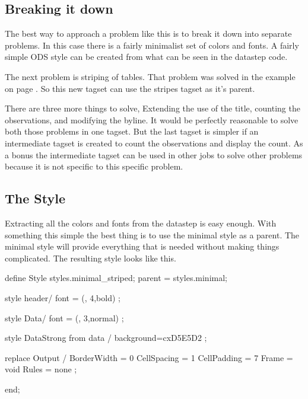 \subsection{Breaking it down}
The best way to approach a problem like this is to break it down into separate
problems.  In this case there is a fairly minimalist set of colors and fonts.
A fairly simple ODS style can be created from what can be seen in the datastep code.

The next problem is striping of tables.  That problem was solved in the example on
page \pageref{striped_table}.
So this new tagset can use the stripes tagset as it's parent.  

There are three more things to solve, Extending the use of the title, counting the 
observations, and modifying the byline.  It would be perfectly
reasonable to solve both those problems in one tagset.  But the last
tagset is simpler if an
intermediate tagset is created to count the observations and display the count.
As a bonus the intermediate tagset can be used in other jobs to solve
other problems because it is not specific to this specific problem.

\subsection{The Style}
Extracting all the colors and fonts from the datastep is easy enough.  
With something this simple the best thing is to use the minimal style as
a parent.  The minimal style will provide everything that is needed 
without making things complicated.
The resulting style looks like this.

\begin{sfvcode}
    define Style styles.minimal_striped; 
        parent = styles.minimal;

        style header/
            font = (, 4,bold)
        ;

        style Data/
            font = (, 3,normal)
        ;

        style DataStrong from data /
            background=cxD5E5D2
        ;

        replace Output /
            BorderWidth = 0
            CellSpacing = 1
            CellPadding = 7
            Frame = void
            Rules = none
        ;

    end;
\end{sfvcode}


